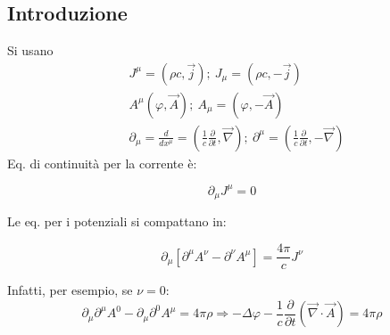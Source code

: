 \documentclass[10pt, a4paper]{scrartcl}
\numberwithin{equation}{subsection}
\theoremstyle{style1}
\newenvironment{boxenv}[1][]{
    \begin{eqbox}[#1]
    }{
   \end{eqbox}
}
\begin{document}
\subsection{Introduzione}
Si usano
\begin{equation}
	\begin{split}
		&J^\mu  = (\rho c , \vec{j}); \ J_\mu  = (\rho  c, - \vec{j})\\
		&A^\mu   (\varphi , \vec{A}); \ A_\mu  = (\varphi , - \vec{A})\\
		&\partial _\mu = \frac{d }{d x^\mu } = \left(\frac{1}{c}\frac{\partial }{\partial t} , \vec{\nabla }\right) ; \ \partial ^\mu  = \left(\frac{1}{c}\frac{\partial }{\partial t} , - \vec{\nabla }\right) 
	\end{split}
\end{equation}
Eq. di continuit\`a per la corrente \`e:
\begin{boxenv}[]
\begin{equation}
	\partial _\mu  J^\mu  = 0
\end{equation}
\end{boxenv}
\noindent Le eq. per i potenziali si compattano in:
\begin{boxenv}[]
\begin{equation}
	\partial _\mu  \left[ \partial ^\mu  A^\nu - \partial ^\nu A^\mu  \right] = \frac{4\pi}{c}J^\nu
\end{equation}
\end{boxenv}
\noindent Infatti, per esempio, se $\nu = 0$:
\begin{equation*}
	\partial _\mu  \partial ^\mu  A^0 - \partial _\mu  \partial ^0 A^\mu  = 4\pi \rho \Rightarrow - \Delta  \varphi  - \frac{1}{c}\frac{\partial }{\partial t} (\vec{\nabla }\cdot \vec{A})= 4\pi \rho 
\end{equation*}
\end{document}
